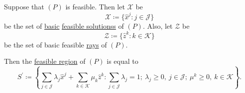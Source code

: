 \begin{theorem}\label{thm:representation-theorem}
	Suppose that \((P)\) is feasible. Then let \(\mathcal{X}\) be
	\[
		\mathcal{X} \coloneqq \{\hat{x}^j \colon j\in \mathcal{J}\}
	\]
	be the set of \hyperref[def:basic-solution]{basic} \hyperref[def:feasible-solution]{feasible solutionss} of \((P)\). Also, let \(\mathcal{Z}\) be
	\[
		\mathcal{Z}\coloneqq \{\hat{z}^k\colon k\in \mathcal{K}\}
	\]
	be the set of basic feasible \hyperref[def:ray]{rays} of \((P)\).

	Then the \hyperref[def:feasible-region]{feasible region} of \((P)\) is equal to
	\[
		S^\prime\coloneqq \left\{\sum\limits_{j\in\mathcal{J}} \lambda_{j} \hat{x}^j + \sum\limits_{k\in\mathcal{K}}\mu_k \hat{z}^k\colon \sum\limits_{j\in\mathcal{J}}\lambda_{j} = 1;\ \lambda_{j}\geq 0,\ j\in \mathcal{J};\ \mu^k\geq 0,\ k\in \mathcal{K}\right\}.
	\]
\end{theorem}
